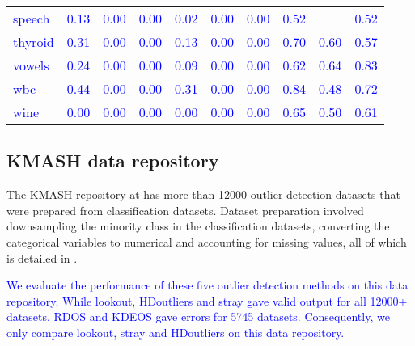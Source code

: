 \documentclass[12pt]{article}
\theoremstyle{definition}
\theoremstyle{definition}
\theoremstyle{definition}
\theoremstyle{definition}
\theoremstyle{remark}
\begin{document}
\begin{table}
\begin{tabular}[t]{lrrrrrrrrr}
\textcolor{blue}{speech} & \textcolor{blue}{0.13} & \textcolor{blue}{0.00} & \textcolor{blue}{0.00} & \textcolor{blue}{0.02} & \textcolor{blue}{0.00} & \textcolor{blue}{0.00} & \textcolor{blue}{0.52} & \textcolor{blue}{} & \textcolor{blue}{0.52}\\
\textcolor{blue}{thyroid} & \textcolor{blue}{0.31} & \textcolor{blue}{0.00} & \textcolor{blue}{0.00} & \textcolor{blue}{0.13} & \textcolor{blue}{0.00} & \textcolor{blue}{0.00} & \textcolor{blue}{0.70} & \textcolor{blue}{0.60} & \textcolor{blue}{0.57}\\
\textcolor{blue}{vowels} & \textcolor{blue}{0.24} & \textcolor{blue}{0.00} & \textcolor{blue}{0.00} & \textcolor{blue}{0.09} & \textcolor{blue}{0.00} & \textcolor{blue}{0.00} & \textcolor{blue}{0.62} & \textcolor{blue}{0.64} & \textcolor{blue}{0.83}\\
\addlinespace
\textcolor{blue}{wbc} & \textcolor{blue}{0.44} & \textcolor{blue}{0.00} & \textcolor{blue}{0.00} & \textcolor{blue}{0.31} & \textcolor{blue}{0.00} & \textcolor{blue}{0.00} & \textcolor{blue}{0.84} & \textcolor{blue}{0.48} & \textcolor{blue}{0.72}\\
\textcolor{blue}{wine} & \textcolor{blue}{0.00} & \textcolor{blue}{0.00} & \textcolor{blue}{0.00} & \textcolor{blue}{0.00} & \textcolor{blue}{0.00} & \textcolor{blue}{0.00} & \textcolor{blue}{0.65} & \textcolor{blue}{0.50} & \textcolor{blue}{0.61}\\
\bottomrule
\end{tabular}
\end{table}

\hypertarget{kmash-data-repository}{%
\subsection{KMASH data repository}\label{kmash-data-repository}}

The KMASH repository at \citet{datasets} has more than 12000 outlier detection datasets that were prepared from classification datasets. Dataset preparation involved downsampling the minority class in the classification datasets, converting the categorical variables to numerical and accounting for missing values, all of which is detailed in \citet{normalizationoutliers}.

\textcolor{blue}{We evaluate the performance of these five outlier detection methods on this data repository. While lookout, HDoutliers and stray gave valid output for all 12000+ datasets, RDOS and KDEOS gave errors for 5745 datasets. Consequently, we only compare lookout, stray and HDoutliers on this data repository.}
\end{document}
